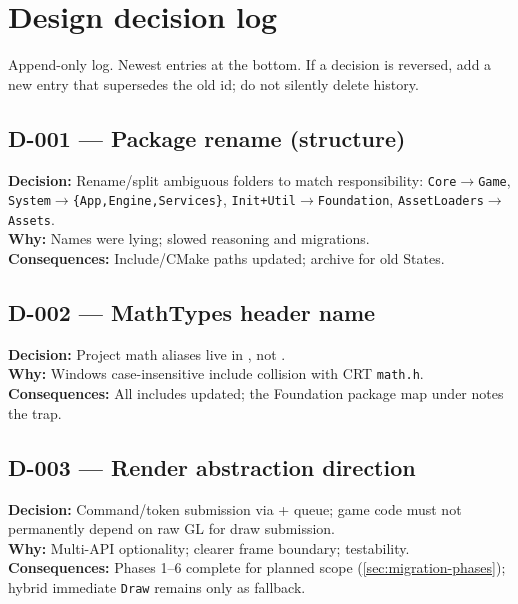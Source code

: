 \section{Design decision log}
\label{sec:decisions}

Append-only log. Newest entries at the bottom. If a decision is reversed, add a
new entry that supersedes the old id; do not silently delete history.

\subsection*{D-001 --- Package rename (structure)}
\begin{decisionbox}[title={D-001 \quad 2026-07-28}]
\textbf{Decision:} Rename/split ambiguous folders to match responsibility:
\texttt{Core$\rightarrow$Game}, \texttt{System$\rightarrow$\{App,Engine,Services\}},
\texttt{Init+Util$\rightarrow$Foundation}, \texttt{AssetLoaders$\rightarrow$Assets}.\\
\textbf{Why:} Names were lying; slowed reasoning and migrations.\\
\textbf{Consequences:} Include/CMake paths updated; archive for old States.
\end{decisionbox}

\subsection*{D-002 --- MathTypes header name}
\begin{decisionbox}[title={D-002 \quad 2026-07-28}]
\textbf{Decision:} Project math aliases live in , not
.\\
\textbf{Why:} Windows case-insensitive include collision with CRT
\texttt{math.h}.\\
\textbf{Consequences:} All includes updated; the Foundation package map under
 notes the trap.
\end{decisionbox}

\subsection*{D-003 --- Render abstraction direction}
\begin{decisionbox}[title={D-003 \quad 2026-07-28 (implemented; see D-R*) }]
\textbf{Decision:} Command/token submission via 
+  queue; game code must not permanently depend on
raw GL for draw submission.\\
\textbf{Why:} Multi-API optionality; clearer frame boundary; testability.\\
\textbf{Consequences:} Phases 1--6 complete for planned scope
(\cref{sec:migration-phases}); hybrid immediate \texttt{Draw} remains only as
fallback.
\end{decisionbox}

